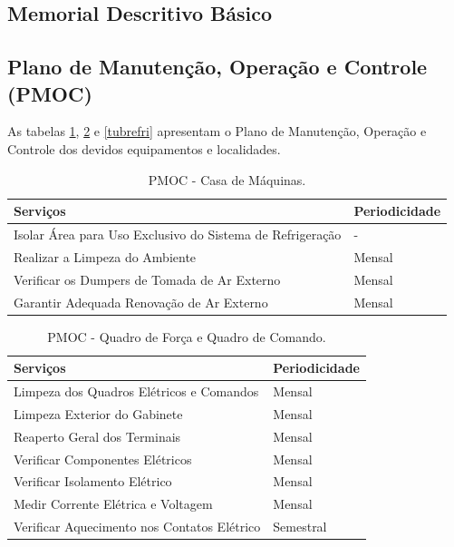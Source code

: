 \documentclass[10pt,a4paper]{article}
\begin{document}
\subsection{Memorial Descritivo Básico}


\newpage
\subsection{Plano de Manutenção, Operação e Controle (PMOC)}

As tabelas \ref{tubcasa}, \ref{tubqc} e \ref{tubrefri} apresentam o Plano de Manutenção, Operação e Controle dos devidos equipamentos e localidades.

\begin{table}[h!]
    \centering
    \vspace{0.8mm}
    \caption{PMOC - Casa de Máquinas.}
    \begin{tabular}{|l|l|}
        \hline      
       \textbf{Serviços} & \textbf{Periodicidade} \\ \hline
        Isolar Área para Uso Exclusivo do Sistema de Refrigeração & - \\ \hline
        Realizar a Limpeza do Ambiente & Mensal \\ \hline
        Verificar os Dumpers de Tomada de Ar Externo & Mensal \\ \hline
        Garantir Adequada Renovação de Ar Externo & Mensal \\ \hline
    \end{tabular}
    \label{tubcasa}
\end{table}

\begin{table}[h!]
    \centering
    \vspace{0.8mm}
    \caption{PMOC - Quadro de Força e Quadro de Comando.}
    \begin{tabular}{|l|l|}
        \hline      
       \textbf{Serviços} & \textbf{Periodicidade} \\ \hline
        Limpeza dos Quadros Elétricos e Comandos & Mensal \\ \hline
        Limpeza Exterior do Gabinete & Mensal \\ \hline
        Reaperto Geral dos Terminais & Mensal \\ \hline
        Verificar Componentes Elétricos & Mensal \\ \hline
        Verificar Isolamento Elétrico & Mensal \\ \hline
        Medir Corrente Elétrica e Voltagem & Mensal \\ \hline
        Verificar Aquecimento nos Contatos Elétrico & Semestral \\ \hline
    \end{tabular}
    \label{tubqc}
\end{table}
\end{document}
